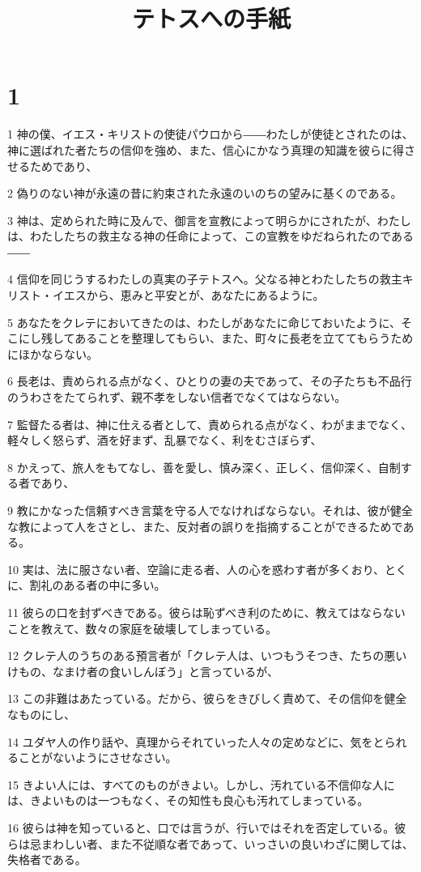 

\title{テトスへの手紙}


\chapter{1}

\par 1 神の僕、イエス・キリストの使徒パウロから――わたしが使徒とされたのは、神に選ばれた者たちの信仰を強め、また、信心にかなう真理の知識を彼らに得させるためであり、
\par 2 偽りのない神が永遠の昔に約束された永遠のいのちの望みに基くのである。
\par 3 神は、定められた時に及んで、御言を宣教によって明らかにされたが、わたしは、わたしたちの救主なる神の任命によって、この宣教をゆだねられたのである――
\par 4 信仰を同じうするわたしの真実の子テトスへ。父なる神とわたしたちの救主キリスト・イエスから、恵みと平安とが、あなたにあるように。
\par 5 あなたをクレテにおいてきたのは、わたしがあなたに命じておいたように、そこにし残してあることを整理してもらい、また、町々に長老を立ててもらうためにほかならない。
\par 6 長老は、責められる点がなく、ひとりの妻の夫であって、その子たちも不品行のうわさをたてられず、親不孝をしない信者でなくてはならない。
\par 7 監督たる者は、神に仕える者として、責められる点がなく、わがままでなく、軽々しく怒らず、酒を好まず、乱暴でなく、利をむさぼらず、
\par 8 かえって、旅人をもてなし、善を愛し、慎み深く、正しく、信仰深く、自制する者であり、
\par 9 教にかなった信頼すべき言葉を守る人でなければならない。それは、彼が健全な教によって人をさとし、また、反対者の誤りを指摘することができるためである。
\par 10 実は、法に服さない者、空論に走る者、人の心を惑わす者が多くおり、とくに、割礼のある者の中に多い。
\par 11 彼らの口を封ずべきである。彼らは恥ずべき利のために、教えてはならないことを教えて、数々の家庭を破壊してしまっている。
\par 12 クレテ人のうちのある預言者が「クレテ人は、いつもうそつき、たちの悪いけもの、なまけ者の食いしんぼう」と言っているが、
\par 13 この非難はあたっている。だから、彼らをきびしく責めて、その信仰を健全なものにし、
\par 14 ユダヤ人の作り話や、真理からそれていった人々の定めなどに、気をとられることがないようにさせなさい。
\par 15 きよい人には、すべてのものがきよい。しかし、汚れている不信仰な人には、きよいものは一つもなく、その知性も良心も汚れてしまっている。
\par 16 彼らは神を知っていると、口では言うが、行いではそれを否定している。彼らは忌まわしい者、また不従順な者であって、いっさいの良いわざに関しては、失格者である。

